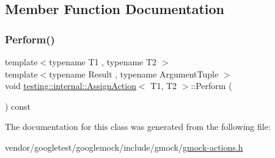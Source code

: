 \subsection{Member Function Documentation}
\mbox{\label{classtesting_1_1internal_1_1_assign_action_a540912bec1f4de6fc4c7de26312e4586}} 
\subsubsection{\texorpdfstring{Perform()}{Perform()}}
{\footnotesize\ttfamily template$<$typename T1 , typename T2 $>$ \\
template$<$typename Result , typename Argument\+Tuple $>$ \\
void \hyperlink{classtesting_1_1internal_1_1_assign_action}{testing\+::internal\+::\+Assign\+Action}$<$ T1, T2 $>$\+::Perform (\begin{DoxyParamCaption}\item[{const Argument\+Tuple \&}]{ }\end{DoxyParamCaption}) const\hspace{0.3cm}{\ttfamily [inline]}}



The documentation for this class was generated from the following file\+:\begin{DoxyCompactItemize}
\item 
vendor/googletest/googlemock/include/gmock/\hyperlink{gmock-actions_8h}{gmock-\/actions.\+h}\end{DoxyCompactItemize}
